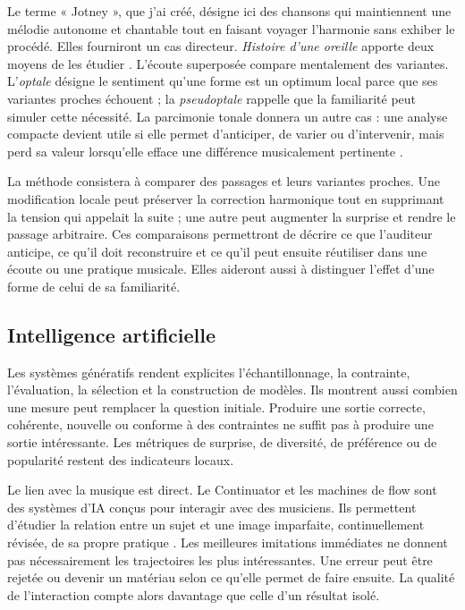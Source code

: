 \documentclass[11pt,a4paper]{article}
\begin{document}
Le terme « Jotney », que j'ai créé, désigne ici des chansons qui maintiennent
une mélodie autonome et chantable tout en faisant voyager l'harmonie sans
exhiber le procédé. Elles fourniront un cas directeur. \emph{Histoire d'une
oreille} apporte deux moyens de les étudier \parencite{pachet2018oreille}.
L'écoute superposée compare mentalement des variantes. L'\emph{optale} désigne
le sentiment qu'une forme est un optimum local parce que ses variantes proches
échouent ; la \emph{pseudoptale} rappelle que la familiarité peut simuler cette
nécessité. La parcimonie tonale donnera un autre cas : une analyse compacte
devient utile si elle permet d'anticiper, de varier ou d'intervenir, mais perd sa
valeur lorsqu'elle efface une différence musicalement pertinente
\parencite{pachet2026tonalparsimony}.

La méthode consistera à comparer des passages et leurs variantes proches. Une
modification locale peut préserver la correction harmonique tout en supprimant
la tension qui appelait la suite ; une autre peut augmenter la surprise et
rendre le passage arbitraire. Ces comparaisons permettront de décrire ce que
l'auditeur anticipe, ce qu'il doit reconstruire et ce qu'il peut ensuite
réutiliser dans une écoute ou une pratique musicale. Elles aideront aussi à
distinguer l'effet d'une forme de celui de sa familiarité.

\subsection{Intelligence artificielle}

Les systèmes génératifs rendent explicites l'échantillonnage, la contrainte,
l'évaluation, la sélection et la construction de modèles. Ils montrent aussi
combien une mesure peut remplacer la question initiale. Produire une sortie
correcte, cohérente, nouvelle ou conforme à des contraintes ne suffit pas à
produire une sortie intéressante. Les métriques de surprise, de diversité, de
préférence ou de popularité restent des indicateurs locaux.

Le lien avec la musique est direct. Le Continuator et les machines de flow sont
des systèmes d'IA conçus pour interagir avec des musiciens. Ils permettent
d'étudier la relation entre un sujet et une image imparfaite, continuellement
révisée, de sa propre pratique
\parencite{pachet2008machines,addessi2005experiments}. Les meilleures imitations
immédiates ne donnent pas nécessairement les trajectoires les plus intéressantes.
Une erreur peut être rejetée ou devenir un matériau selon ce qu'elle permet de
faire ensuite. La qualité de l'interaction compte alors davantage que celle
d'un résultat isolé.
\end{document}
